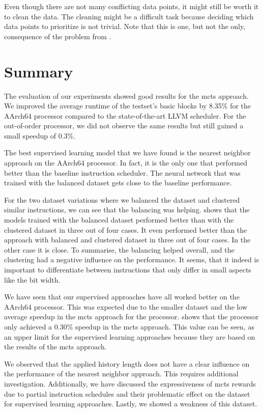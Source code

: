 Even though there are not many conflicting data points, it might still be worth it to clean the data.
The cleaning might be a difficult task because deciding which data points to prioritize is not trivial.
Note that this is one, but not the only, consequence of the problem from .


\section{Summary}
The evaluation of our experiments showed good results for the \ac{mcts} approach.
We improved the average runtime of the testset's basic blocks by 8.35\% for the AArch64 processor compared to the state-of-the-art LLVM scheduler.
For the out-of-order \aurora processor, we did not observe the same results but still gained a small speedup of 0.3\%.

The best supervised learning model that we have found is the nearest neighbor approach on the AArch64 processor.
In fact, it is the only one that performed better than the baseline instruction scheduler.
The neural network that was trained with the balanced dataset gets close to the baseline performance.

For the two dataset variations where we balanced the dataset and clustered similar instructions, we can see that the balancing was helping.
 shows that the models trained with the balanced dataset performed better than with the clustered dataset in three out of four cases.
It even performed better than the approach with balanced and clustered dataset in three out of four cases.
In the other case it is close.
To summarise, the balancing helped overall, and the clustering had a negative influence on the performance.
It seems, that it indeed is important to differentiate between instructions that only differ in small aspects like the bit width. 

We have seen that our supervised approaches have all worked better on the AArch64 processor.
This was expected due to the smaller dataset and the low average speedup in the \ac{mcts} approach for the \aurora{} processor.
 shows that the \aurora{} processor only achieved a 0.30\% speedup in the \ac{mcts} approach.
This value can be seen, as an upper limit for the supervised learning approaches because they are based on the results of the \ac{mcts} approach.

We observed that the applied history length does not have a clear influence on the performance of the nearest neighbor approach.
This requires additional investigation.
Additionally, we have discussed the expressiveness of \ac{mcts} rewards due to partial instruction schedules and their problematic effect on the dataset for supervised learning approaches.
Lastly, we showed a weakness of this dataset.

